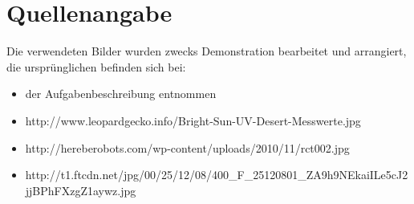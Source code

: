 \section*{Quellenangabe}
Die verwendeten Bilder wurden zwecks Demonstration bearbeitet und arrangiert, die ursprünglichen befinden sich bei:
\begin{itemize}
	\item der Aufgabenbeschreibung entnommen
	\item http://www.leopardgecko.info/Bright-Sun-UV-Desert-Messwerte.jpg
	\item http://hereberobots.com/wp-content/uploads/2010/11/rct002.jpg
	\item http://t1.ftcdn.net/jpg/00/25/12/08/400\_F\_25120801\_ZA9h9NEkaiILe5cJ2jjBPhFXzgZ1aywz.jpg
\end{itemize}